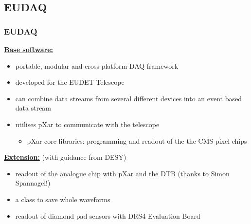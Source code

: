 \documentclass[9pt]{beamer}
\begin{document}
\subsection{EUDAQ}
\begin{frame}
	\frametitle{EUDAQ}
	\underline{\textbf{Base software:}}
	\begin{itemize}
		\setlength{\itemsep}{\fill}
		\item portable, modular and cross-platform DAQ framework
		\item developed for the EUDET Telescope
		\item can combine data streams from several different devices into an event based data stream
		\item utilises pXar to communicate with the telescope
		\begin{itemize}
			\item pXar-core libraries: programming and readout of the the CMS pixel chips
		\end{itemize}
	\end{itemize}
	\vspace*{.7cm}
	\underline{\textbf{Extension:}} (with guidance from DESY)
	\begin{itemize}
		\setlength{\itemsep}{\fill}
		\item readout of the analogue chip with pXar and the DTB (thanks to Simon Spannagel!)
		\item a class to save whole waveforms
		\item readout of diamond pad sensors with DRS4 Evaluation Board
	\end{itemize}
\end{frame}
\end{document}

